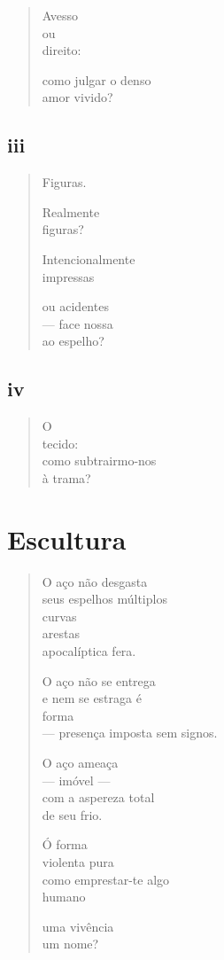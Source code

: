 \begin{verse}
Avesso\\
ou\\
direito:

como julgar o denso\\
amor vivido?
\end{verse}

\medskip
\section{iii}

\begin{verse}
Figuras.

Realmente\\
figuras?

Intencionalmente\\
impressas

ou acidentes\\
--- face nossa\\
\quad{}ao espelho?
\end{verse}

\medskip
\section{iv}

\begin{verse}
O\\
tecido:\\
como subtrairmo-nos\\
à trama?
\end{verse}

\chapter{Escultura}

\begin{verse}
O aço não desgasta\\
seus espelhos múltiplos\\
curvas\\
arestas\\
apocalíptica fera.

O aço não se entrega\\
e nem se estraga é\\
\hfill{}forma\\
--- presença imposta sem signos.

O aço ameaça\\
--- imóvel ---\\
com a aspereza total\\
de seu frio.

Ó forma\\
violenta pura\\
como emprestar-te algo\\
\hfill{}humano

uma vivência\\
um nome?
\end{verse}

